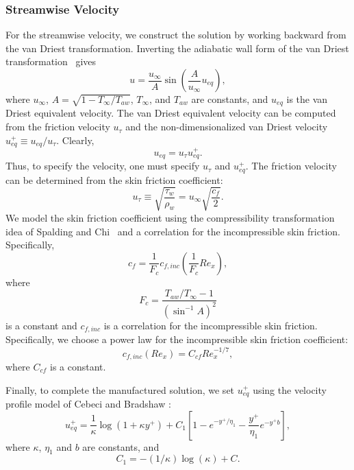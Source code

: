 \subsubsection{Streamwise Velocity}
For the streamwise velocity, we construct the solution by working
backward from the van Driest transformation.  Inverting the adiabatic
wall form of the van Driest transformation~\cite{VanDriest_1956, White1991} gives
%
\begin{equation} \label{eqn:streamwise_velocity}
u = \frac{u_{\infty}}{A} \sin \left( \frac{A}{u_{\infty}} u_{eq} \right),
\end{equation}
% 
where $u_{\infty}$, $A = \sqrt{1 - T_{\infty}/T_{aw}}$,
$T_{\infty}$, and $T_{aw}$ are constants, and $u_{eq}$ is the van
Driest equivalent velocity.  The van Driest equivalent velocity can be
computed from the friction velocity $u_{\tau}$ and the
non-dimensionalized van Driest velocity $u_{eq}^+ \equiv
u_{eq}/u_{\tau}$.  Clearly,
%
\begin{equation}\label{eqn:van_Driest}
u_{eq} = u_{\tau} u_{eq}^+.
\end{equation}
% 
Thus, to specify the velocity, one must specify $u_{\tau}$ and
$u_{eq}^+$.  The friction velocity can be determined from the skin
friction coefficient:
%
\begin{equation} \label{eqn:utau}
u_{\tau} \equiv \sqrt{\frac{\tau_{w}}{\rho_w}} = u_{\infty} \sqrt{\frac{c_f}{2}}.
\end{equation}
% 
We model the skin friction coefficient using the compressibility
transformation idea of Spalding and Chi~\cite{Chi_Spalding_1966} and a correlation for
the incompressible skin friction.  Specifically,
%
\begin{equation} \label{eqn:skin_friction}
c_f = \frac{1}{F_c} c_{f,inc}\left( \frac{1}{F_c} Re_x \right),
\end{equation}
%
where
%
\begin{equation} \label{eqn:Fc}
F_c = \frac{T_{aw}/T_{\infty} - 1}{ \left( \sin^{-1} A \right)^2}
\end{equation}
%
is a constant and $c_{f,inc}$ is a correlation for the incompressible
skin friction.  Specifically, we choose a power law for the
incompressible skin friction coefficient:
%
\begin{equation} \label{eqn:cf_inc}
c_{f,inc}(Re_x) = C_{cf} Re_{x}^{-1/7},
\end{equation}
%
where $C_{cf}$ is a constant.

Finally, to complete the manufactured solution, we set $u^+_{eq}$
using the velocity profile model of Cebeci and Bradshaw \cite{Cebeci_Bradshaw_1980}:
%
\begin{equation} \label{eqn:nd_incomp_profile}
u_{eq}^+ = \frac{1}{\kappa} \log \left( 1 + \kappa y^+ \right) + C_1 \left[ 1 - e^{-y^+/\eta_1} - \frac{y^+}{\eta_1} e^{-y^+ b} \right],
\end{equation}
%
where $\kappa$,  $\eta_1$ and $b$ are constants, and
%
\begin{equation} \label{eqn:C1}
C_1 = -(1/\kappa) \log(\kappa) + C.
\end{equation}

